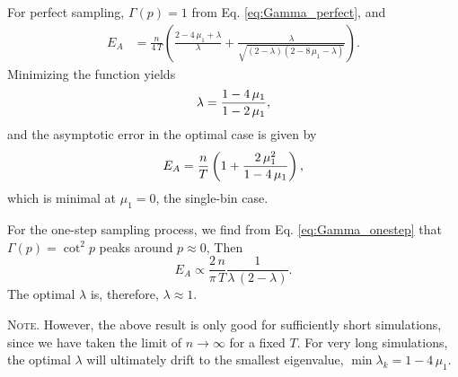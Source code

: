 \documentclass[reprint, floatfix]{revtex4-1}
\newcommand{\note}[1]{{\color{DarkGreen}\footnotesize \textsc{Note.} #1}}
\newcommand{\Err}{E}
\begin{document}
For perfect sampling,
$\Gamma(p) = 1$ from Eq. \eqref{eq:Gamma_perfect},
and
$$
\begin{aligned}
  \Err_A
  &=
  \frac{n}{4 \, T}
  \left(
    \frac{2 - 4 \, \mu_1 + \lambda}{ \lambda }
    +
    \frac{ \lambda }
    { \sqrt{ (2 - \lambda) (2 - 8 \, \mu_1 - \lambda) } }
  \right)
.
\end{aligned}
$$
%
Minimizing the function yields
%
\begin{equation}
  \lambda
  =
  \frac{ 1 - 4 \, \mu_1 }
       { 1 - 2 \, \mu_1 }
  ,
\notag
\end{equation}
%
and the asymptotic error in the optimal case is given by
%
\begin{equation}
  \Err_A
  =
  \frac{n}{T}
  \left(
    1+ \frac{2 \, \mu_1^2}{1-4 \, \mu_1}
  \right)
  ,
\notag
\end{equation}
%
which
is minimal at $\mu_1 = 0$, the single-bin case.
%


For the one-step sampling process,
we find from Eq. \eqref{eq:Gamma_onestep}
that $\Gamma(p) = \cot^2 p$
peaks around $p \approx 0$,
%
Then
$$
  \Err_A
  \propto
  \frac{   2 \, n }
       { \pi \, T }
  \frac{             1             }
       {  \lambda \, (2 - \lambda) }
  .
$$
%
The optimal $\lambda$ is, therefore,
%
$
  \lambda \approx 1.
$
%

\note{
However, the above result %
is only good
for sufficiently short simulations,
since we have taken the limit of $n \to \infty$
for a fixed $T$.
%
For very long simulations,
the optimal $\lambda$
will ultimately drift to
the smallest eigenvalue,
$\min \lambda_k = 1 - 4 \, \mu_1$.
}




\end{document}
